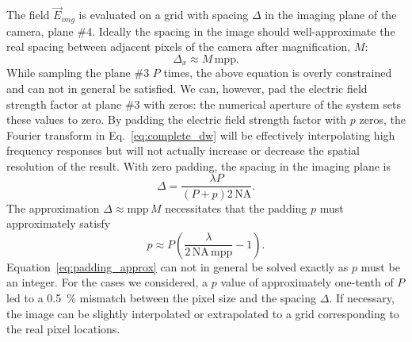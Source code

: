   The field $\vec{E}_{img}$ is evaluated on a grid with spacing $\Delta$
  in the imaging plane of the camera, plane \#4. Ideally the spacing in the image
  should well-approximate the real spacing between adjacent 
  pixels of the camera after magnification, $M$:
  \begin{equation}
  \Delta_x \approx M\, \text{mpp}.
  \end{equation}        
  While sampling the plane \#3 $P$ times, the above equation is overly constrained and
  can not in general be satisfied. We can, however, pad the electric field strength factor
  at plane \#3 with zeros: the numerical aperture of the system sets these values to
  zero. By padding the electric field strength factor with $p$ zeros,
  the Fourier transform in Eq.~\ref{eq:complete_dw} will be effectively
  interpolating high frequency responses but will not actually increase or decrease
  the spatial resolution of the result. With zero padding, the spacing in the imaging
  plane is
  \begin{equation}
  \Delta = \frac{\lambda P}{\left ( P + p \right ) 2\, \text{NA}}.
  \end{equation} 
  The approximation $\Delta \approx \text{mpp} \, M$  necessitates that the
  padding $p$ must approximately satisfy
  \begin{equation}
    p \approx P \left ( \frac{\lambda}{2 \, \text{NA} \, \text{mpp}} - 1 \right ).
    \label{eq:padding_approx}
  \end{equation}
  Equation~\ref{eq:padding_approx} can not in general be solved exactly as $p$
  must be an integer. For the cases we considered, a $p$ value of approximately
  one-tenth of $P$ led to a \SI{0.5}{\percent} mismatch between the pixel size
  and the spacing $\Delta$. If necessary, the image can be slightly interpolated
  or extrapolated to a grid corresponding to the real pixel locations.
  
